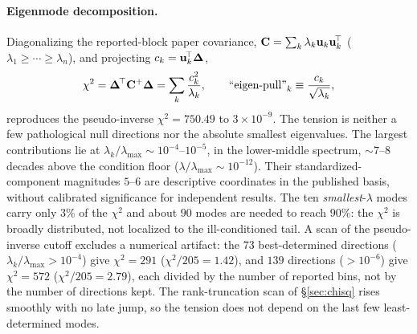 \paragraph{Eigenmode decomposition.} Diagonalizing the reported-block paper covariance, $\mathbf{C}=\sum_{k}\lambda_{k}\mathbf{u}_{k}\mathbf{u}_{k}^{\!\top}$ ($\lambda_{1}\!\ge\!\cdots\!\ge\!\lambda_{n}$), and projecting $c_{k}=\mathbf{u}_{k}^{\!\top}\boldsymbol{\Delta}$,
\begin{equation}
\chi^{2}=\boldsymbol{\Delta}^{\!\top}\mathbf{C}^{+}\boldsymbol{\Delta}
=\sum_{k}\frac{c_{k}^{2}}{\lambda_{k}},
\qquad
\text{``eigen-pull''}_{k}\equiv\frac{c_{k}}{\sqrt{\lambda_{k}}},
\end{equation}
reproduces the pseudo-inverse $\chi^{2}=750.49$ to $3\times10^{-9}$. The tension is neither a few pathological null directions nor the absolute smallest eigenvalues. The largest contributions lie at $\lambda_{k}/\lambda_{\max}\sim10^{-4}$--$10^{-5}$, in the lower-middle spectrum, $\sim7$--$8$ decades above the condition floor ($\lambda/\lambda_{\max}\sim10^{-12}$). Their standardized-component magnitudes $5$--$6$ are descriptive coordinates in the published basis, without calibrated significance for independent results. The ten \emph{smallest}-$\lambda$ modes carry only $3\%$ of the $\chi^{2}$ and about $90$ modes are needed to reach $90\%$: the $\chi^{2}$ is broadly distributed, not localized to the ill-conditioned tail. A scan of the pseudo-inverse cutoff excludes a numerical artifact: the $73$ best-determined directions ($\lambda_{k}/\lambda_{\max}>10^{-4}$) give $\chi^{2}=291$ ($\chi^{2}/205=1.42$), and $139$ directions ($>10^{-6}$) give $\chi^{2}=572$ ($\chi^{2}/205=2.79$), each divided by the number of reported bins, not by the number of directions kept. The rank-truncation scan of \S\ref{sec:chisq} rises smoothly with no late jump, so the tension does not depend on the last few least-determined modes.

